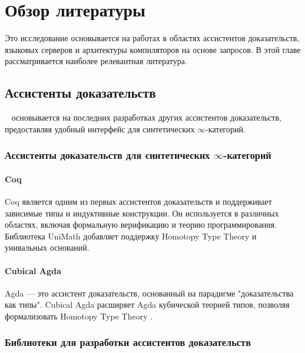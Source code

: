 \chapter{Обзор литературы}
\label{chap:lr}

Это исследование основывается на работах в областях ассистентов доказательств, языковых серверов и архитектуры компиляторов на основе запросов. В этой главе рассматривается наиболее релевантная литература.

\section{Ассистенты доказательств}

\Rzk{}~\cite{kudasov2023experimental} основывается на последних разработках других ассистентов доказательств, предоставляя удобный интерфейс для синтетических $\infty$-категорий.

\subsection{Ассистенты доказательств для синтетических $\infty$-категорий}

\subsubsection{Coq}

Coq \cite{huet1997coq} является одним из первых ассистентов доказательств и поддерживает зависимые типы и индуктивные конструкции. Он используется в различных областях, включая формальную верификацию и теорию программирования. Библиотека UniMath \cite{DanielGrayson2024, MacPherson2019} добавляет поддержку Homotopy Type Theory и унивальных оснований.

\subsubsection{Cubical Agda}

Agda \cite{BoveDybjerNorell2009} — это ассистент доказательств, основанный на парадигме "доказательства как типы". Cubical Agda \cite{VEZZOSI2021} расширяет Agda кубической теорией типов, позволяя формализовать Homotopy Type Theory \cite{Cohen2016}.

\subsection{Библиотеки для разработки ассистентов доказательств}

